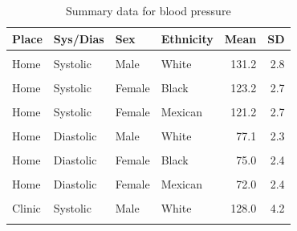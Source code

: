 \documentclass[
]{article}
\begin{document}
\begin{table}[!h]

\caption{\label{tab:summaries}Summary data for blood pressure}
\centering
\begin{tabular}[t]{llllrr}
\toprule
Place & Sys/Dias & Sex & Ethnicity & Mean & SD\\
\midrule
\cellcolor{gray!6}{Home} & \cellcolor{gray!6}{Systolic} & \cellcolor{gray!6}{Male} & \cellcolor{gray!6}{Black} & \cellcolor{gray!6}{128.8} & \cellcolor{gray!6}{2.7}\\
Home & Systolic & Male & White & 131.2 & 2.8\\
\cellcolor{gray!6}{Home} & \cellcolor{gray!6}{Systolic} & \cellcolor{gray!6}{Male} & \cellcolor{gray!6}{Mexican} & \cellcolor{gray!6}{127.1} & \cellcolor{gray!6}{2.5}\\
Home & Systolic & Female & Black & 123.2 & 2.7\\
\cellcolor{gray!6}{Home} & \cellcolor{gray!6}{Systolic} & \cellcolor{gray!6}{Female} & \cellcolor{gray!6}{White} & \cellcolor{gray!6}{127.2} & \cellcolor{gray!6}{2.9}\\
Home & Systolic & Female & Mexican & 121.2 & 2.7\\
\addlinespace
\cellcolor{gray!6}{Home} & \cellcolor{gray!6}{Diastolic} & \cellcolor{gray!6}{Male} & \cellcolor{gray!6}{Black} & \cellcolor{gray!6}{78.7} & \cellcolor{gray!6}{2.4}\\
Home & Diastolic & Male & White & 77.1 & 2.3\\
\cellcolor{gray!6}{Home} & \cellcolor{gray!6}{Diastolic} & \cellcolor{gray!6}{Male} & \cellcolor{gray!6}{Mexican} & \cellcolor{gray!6}{76.8} & \cellcolor{gray!6}{2.4}\\
Home & Diastolic & Female & Black & 75.0 & 2.4\\
\cellcolor{gray!6}{Home} & \cellcolor{gray!6}{Diastolic} & \cellcolor{gray!6}{Female} & \cellcolor{gray!6}{White} & \cellcolor{gray!6}{73.7} & \cellcolor{gray!6}{2.3}\\
Home & Diastolic & Female & Mexican & 72.0 & 2.4\\
\addlinespace
\cellcolor{gray!6}{Clinic} & \cellcolor{gray!6}{Systolic} & \cellcolor{gray!6}{Male} & \cellcolor{gray!6}{Black} & \cellcolor{gray!6}{127.7} & \cellcolor{gray!6}{3.5}\\
Clinic & Systolic & Male & White & 128.0 & 4.2\\
\cellcolor{gray!6}{Clinic} & \cellcolor{gray!6}{Systolic} & \cellcolor{gray!6}{Male} & \cellcolor{gray!6}{Mexican} & \cellcolor{gray!6}{123.5} & \cellcolor{gray!6}{3.5}\\

\end{tabular}
\end{table}
\end{document}
